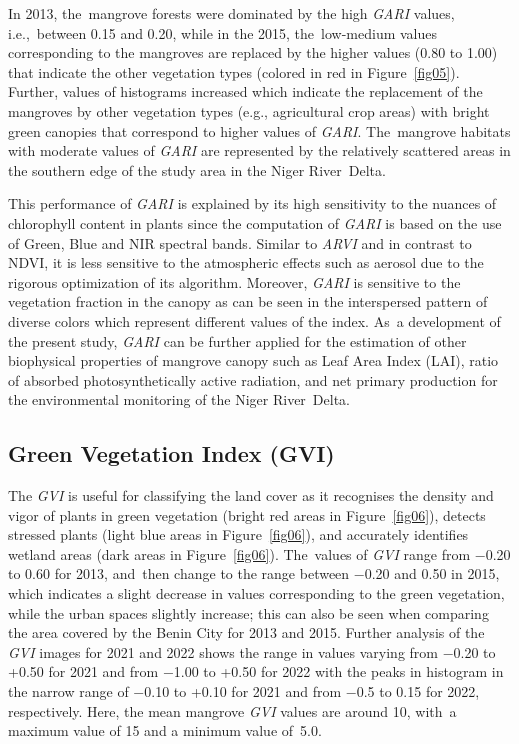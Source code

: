 \documentclass[jmse,article,accept,pdftex,moreauthors]{Definitions/mdpi}
\begin{document}
In 2013, the~mangrove forests were dominated by the high \emph{GARI} values, i.e.,~between 0.15 and 0.20, while in the 2015, the~low-medium values corresponding to the  mangroves are replaced by the higher values (0.80 to 1.00) that indicate the other vegetation types (colored in red in Figure~\ref{fig05}). Further, values of histograms increased which indicate the replacement of the mangroves by other vegetation types (e.g., agricultural crop areas) with bright green canopies that correspond to higher values of \emph{GARI}. The~mangrove habitats with moderate values of \emph{GARI} are represented by the relatively scattered areas in the southern edge of the study area in the Niger River~Delta.

This performance of \emph{GARI} is explained by its high sensitivity to the nuances of chlorophyll content in plants since the computation of \emph{GARI} is based on the use of Green, Blue and NIR spectral bands. Similar to \emph{ARVI} and in contrast to NDVI, it is less sensitive to the atmospheric effects such as aerosol due to the rigorous optimization of its algorithm. Moreover, \emph{GARI} is sensitive to the vegetation fraction in the canopy as can be seen in the interspersed pattern of diverse colors which represent different values of the index. As~a development of the present study, \emph{GARI} can be further applied for the estimation of other biophysical properties of mangrove canopy such as Leaf Area Index (LAI), ratio of absorbed photosynthetically active radiation, and net primary production for the environmental monitoring of the Niger River~Delta.
\subsection{Green Vegetation Index (GVI)}

The \emph{GVI} is useful for classifying the land cover as it recognises the density and vigor of plants in green vegetation (bright red areas in Figure~\ref{fig06}), detects stressed plants (light blue areas in Figure~\ref{fig06}), and accurately identifies wetland areas (dark areas in Figure~\ref{fig06}). The~values of \emph{GVI} range from $-$0.20 to 0.60 for 2013, and~then change to the range between $-$0.20 and 0.50 in 2015, which indicates a slight decrease in values corresponding to the green vegetation, while the urban spaces slightly increase; this can also be seen when comparing the area covered by the Benin City for 2013 and 2015. Further analysis of the \emph{GVI} images for 2021 and 2022 shows the range in values varying from $-$0.20 to +0.50 for 2021 and from $-$1.00 to +0.50 for 2022 with the peaks in histogram in the narrow range of $-$0.10 to +0.10 for 2021 and from $-$0.5 to 0.15 for 2022, respectively. Here, the mean mangrove \emph{GVI} values are around 10, with~a maximum value of 15 and a minimum value of~5.0. 
\end{document}
